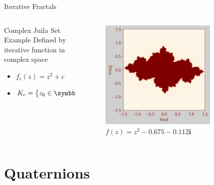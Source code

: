 \documentclass[aspectratio=169,t]{beamer}
\DeclarePairedDelimiter\abs{\lvert}{\rvert} %
\begin{document}
\begin{frame}[label={sec:org9b7ea16}]{Iterative Fractals}
\begin{columns}
\begin{column}{0.55\columnwidth}
\begin{block}{Complex Juila Set Example}
Defined by iterative function in complex space

\begin{itemize}
\item \(f_c (z) = z^2 + c\)

\item \(K_c = \left\{ z_0 \in \symbb{C}: \abs{f^k_c \left(z_0 \right)} > B \text{ as } k \to \infty\right\}\)
\end{itemize}
\end{block}
\end{column}

\begin{column}{0.45\columnwidth}
\begin{figure}[htbp]
\centering
\includegraphics[width=0.80\textwidth]{./Figs/Fig_2v2.png}
\caption{\(f(z) = z^2 -0.675 - 0.112\symbf{i}\)}
\end{figure}
\end{column}
\end{columns}
\end{frame}

\section{Quaternions}
\label{sec:org41d15ad}
\end{document}
